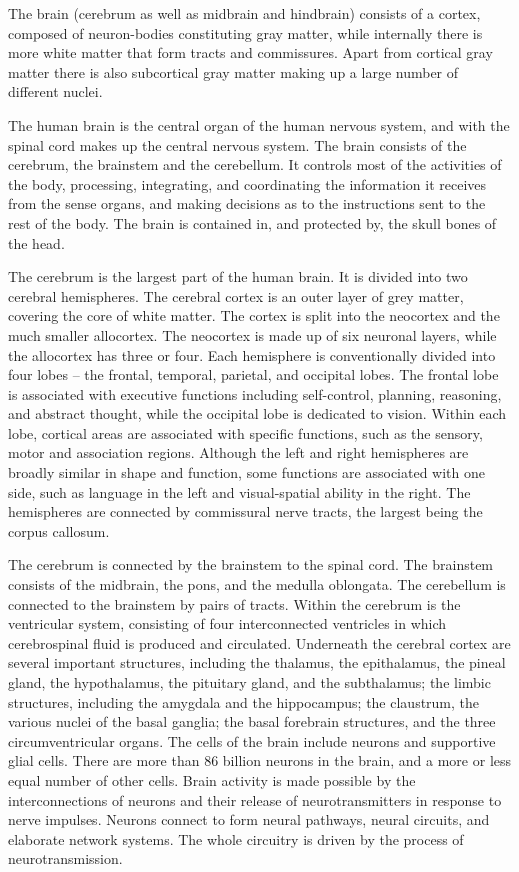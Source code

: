 \documentclass[]{book}
\begin{document}
The brain (cerebrum as well as midbrain and hindbrain) consists of a cortex, composed of neuron-bodies constituting gray matter, while internally there is more white matter that form tracts and commissures. Apart from cortical gray matter there is also subcortical gray matter making up a large number of different nuclei.

The human brain is the central organ of the human nervous system, and with the spinal cord makes up the central nervous system. The brain consists of the cerebrum, the brainstem and the cerebellum. It controls most of the activities of the body, processing, integrating, and coordinating the information it receives from the sense organs, and making decisions as to the instructions sent to the rest of the body. The brain is contained in, and protected by, the skull bones of the head.

The cerebrum is the largest part of the human brain. It is divided into two cerebral hemispheres. The cerebral cortex is an outer layer of grey matter, covering the core of white matter. The cortex is split into the neocortex and the much smaller allocortex. The neocortex is made up of six neuronal layers, while the allocortex has three or four. Each hemisphere is conventionally divided into four lobes -- the frontal, temporal, parietal, and occipital lobes. The frontal lobe is associated with executive functions including self-control, planning, reasoning, and abstract thought, while the occipital lobe is dedicated to vision. Within each lobe, cortical areas are associated with specific functions, such as the sensory, motor and association regions. Although the left and right hemispheres are broadly similar in shape and function, some functions are associated with one side, such as language in the left and visual-spatial ability in the right. The hemispheres are connected by commissural nerve tracts, the largest being the corpus callosum.

The cerebrum is connected by the brainstem to the spinal cord. The brainstem consists of the midbrain, the pons, and the medulla oblongata. The cerebellum is connected to the brainstem by pairs of tracts. Within the cerebrum is the ventricular system, consisting of four interconnected ventricles in which cerebrospinal fluid is produced and circulated. Underneath the cerebral cortex are several important structures, including the thalamus, the epithalamus, the pineal gland, the hypothalamus, the pituitary gland, and the subthalamus; the limbic structures, including the amygdala and the hippocampus; the claustrum, the various nuclei of the basal ganglia; the basal forebrain structures, and the three circumventricular organs. The cells of the brain include neurons and supportive glial cells. There are more than 86 billion neurons in the brain, and a more or less equal number of other cells. Brain activity is made possible by the interconnections of neurons and their release of neurotransmitters in response to nerve impulses. Neurons connect to form neural pathways, neural circuits, and elaborate network systems. The whole circuitry is driven by the process of neurotransmission.
\end{document}

